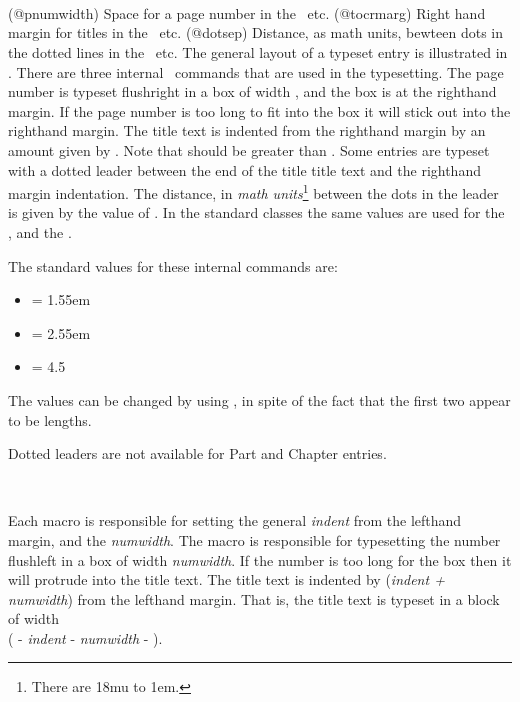  
\begin{syntax}
\cmd{\@pnumwidth} \\
\cmd{\@tocrmarg} \\
\cmd{\@dotsep} \\
\end{syntax}
\glossary(@pnumwidth)%
  {}%
  {Space for a page number in the \prtoc\ etc.}
\glossary(@tocrmarg)%
  {}%
  {Right hand margin for titles in the \prtoc\ etc.}
\glossary(@dotsep)%
  {}%
  {Distance, as  math units, bewteen dots in the dotted lines 
   in the \prtoc\ etc.}
The general layout of a typeset entry is illustrated in . 
There are three
internal \ltx\ commands that are used in the typesetting. The page
number is typeset flushright in a box of width \cmd{\@pnumwidth}, and the box
is at the righthand margin. If the page number is too long 
to fit into  the box it will stick out into the righthand 
margin.
The title text is indented from the righthand margin by an 
amount given by \cmd{\@tocrmarg}.
Note that \cmd{\@tocrmarg} should be greater than \cmd{\@pnumwidth}. Some
entries are typeset with a dotted leader between the end of the title
title text and the righthand margin indentation. 
The distance, in
\emph{math units}\footnote{There are 18mu to 1em.} 
between the dots in the leader is given by the value of \cmd{\@dotsep}. 
In the standard classes the same values are used for the \toc, \lof{} and 
the \lot.

    The standard values for these internal commands are:
 \begin{itemize}
 \item \cmd{\@pnumwidth} = 1.55em
 \item \cmd{\@tocrmarg} = 2.55em 
 \item \cmd{\@dotsep} = 4.5
 \end{itemize}
 The values can be changed by using \cmd{\renewcommand}, in spite of the
 fact that the first two appear to be lengths.

    Dotted leaders are not available for Part and 
Chapter \toc{} entries.

\begin{syntax}
\cmd{\numberline} \\
\end{syntax}
    Each \cmd{\l@kind} macro is responsible for setting the general 
 \textit{indent} from the lefthand margin, and the 
\textit{numwidth}.
The \cmd{\numberline} macro is responsible for typesetting the number 
flushleft in a box of width \textit{numwidth}. If the number is too long 
for the box then it will protrude into the title text. The title text is 
indented by (\textit{indent + numwidth}) from the lefthand 
margin. That is, the title text is typeset in a 
block of width \\
(\lnc{\linewidth} - \textit{indent} - \textit{numwidth} - \cmd{\@tocrmarg}). 

